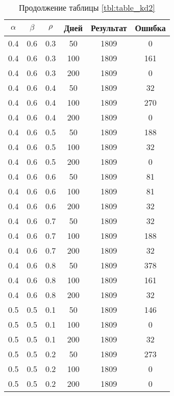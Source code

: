 \begin{table}[h]
	\begin{center}
        \begin{threeparttable}
        \captionsetup{justification=raggedright,singlelinecheck=off}
		\caption*{Продолжение таблицы \ref{tbl:table_kd2}}
		\begin{tabular}{|c|c|c|c|c|c|}
  	\hline
	$\alpha$ & $\beta$ & $\rho$ & Дней & Результат & Ошибка \\\hline
		0.4 &  0.6 &  0.3 &   50 &  1809 &     0 \\
		0.4 &  0.6 &  0.3 &  100 &  1809 &   161 \\
		0.4 &  0.6 &  0.3 &  200 &  1809 &     0 \\
	   \hline
		0.4 &  0.6 &  0.4 &   50 &  1809 &    32 \\
		0.4 &  0.6 &  0.4 &  100 &  1809 &   270 \\
		0.4 &  0.6 &  0.4 &  200 &  1809 &     0 \\
	   \hline
		0.4 &  0.6 &  0.5 &   50 &  1809 &   188 \\
		0.4 &  0.6 &  0.5 &  100 &  1809 &    32 \\
		0.4 &  0.6 &  0.5 &  200 &  1809 &     0 \\
	   \hline
		0.4 &  0.6 &  0.6 &   50 &  1809 &    81 \\
		0.4 &  0.6 &  0.6 &  100 &  1809 &    81 \\
		0.4 &  0.6 &  0.6 &  200 &  1809 &    32 \\
	   \hline
		0.4 &  0.6 &  0.7 &   50 &  1809 &    32 \\
		0.4 &  0.6 &  0.7 &  100 &  1809 &   188 \\
		0.4 &  0.6 &  0.7 &  200 &  1809 &    32 \\
	   \hline
		0.4 &  0.6 &  0.8 &   50 &  1809 &   378 \\
		0.4 &  0.6 &  0.8 &  100 &  1809 &   161 \\
		0.4 &  0.6 &  0.8 &  200 &  1809 &    32 \\
	   \hline
		0.5 &  0.5 &  0.1 &   50 &  1809 &   146 \\
		0.5 &  0.5 &  0.1 &  100 &  1809 &     0 \\
		0.5 &  0.5 &  0.1 &  200 &  1809 &    32 \\
	   \hline
		0.5 &  0.5 &  0.2 &   50 &  1809 &   273 \\
		0.5 &  0.5 &  0.2 &  100 &  1809 &     0 \\
		0.5 &  0.5 &  0.2 &  200 &  1809 &     0 \\

\end{tabular}
\end{threeparttable}
\end{center}
\end{table}
